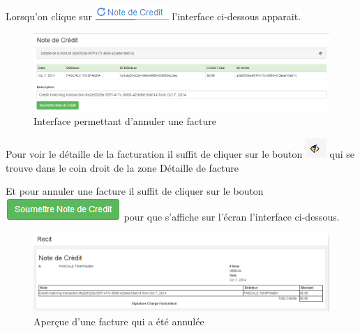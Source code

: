 \documentclass[12pt,a4paper]{report}
\begin{document}
Lorsqu'on clique sur \includegraphics[scale=0.7]{pic/NoteCredit.png}  l'interface ci-dessous apparait.

\begin{figure}[h]
\begin{center}
\includegraphics[width=14cm]{pic/NoteCreditMenu.png}
\end{center}
\caption{Interface permettant d'annuler une facture}
\label{Interface permettant d'annuler une facture}
\end{figure}

Pour voir le détaille de la facturation il suffit de cliquer sur le bouton \includegraphics[scale=0.7]{pic/SeeInvoice.png} qui se trouve dans le coin droit de la zone Détaille de facture   


Et pour annuler une facture il suffit de cliquer sur le bouton \includegraphics[scale=0.7]{pic/SubmitNoteCredit.png}  pour que s'affiche sur l'écran l'interface ci-dessous.

\begin{figure}[h]
\begin{center}
\includegraphics[width=14cm]{pic/RecetteCredit.png}
\end{center}
\caption{Aperçue d'une facture qui a été annulée}
\label{Aperçue d'une facture qui a été annulée}
\end{figure}
\end{document}

